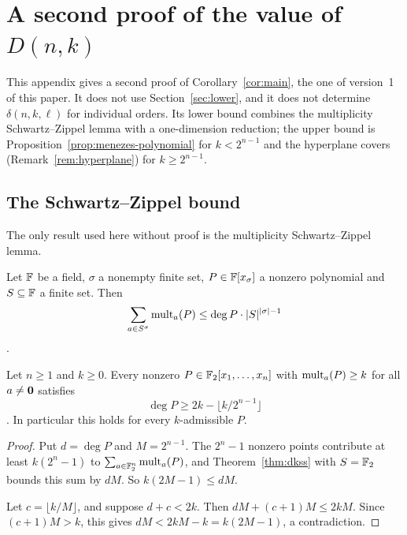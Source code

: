 \section{A second proof of the value of \texorpdfstring{\(D(n,k)\)}{D(n,k)}}\label{sec:second-proof}

This appendix gives a second proof of Corollary~\ref{cor:main}, the one of
version~1 of this paper. It does not use Section~\ref{sec:lower}, and it does not
determine \(\delta(n,k,\ell)\) for individual orders. Its lower bound combines
the multiplicity Schwartz--Zippel lemma with a one-dimension reduction; the
upper bound is Proposition~\ref{prop:menezes-polynomial} for \(k<2^{n-1}\) and
the hyperplane covers (Remark~\ref{rem:hyperplane}) for \(k\ge2^{n-1}\).

\subsection{The Schwartz--Zippel bound}

The only result used here without proof is the multiplicity Schwartz--Zippel
lemma.

\begin{theorem}\label{thm:dkss}
Let \(\mathbb F\) be a field, \(\sigma\) a nonempty finite set, \(P\in\mathbb F[x_\sigma]\) a
nonzero polynomial and \(S\subseteq\mathbb F\) a finite set. Then
\[
 \sum_{a\in S^\sigma}\operatorname{mult}_a(P)\le\deg P\cdot|S|^{|\sigma|-1}
\]
.
\end{theorem}

\begin{proposition}\label{prop:cover-bound}
Let \(n\ge1\) and \(k\ge0\). Every nonzero \(P\in\mathbb F_2[x_1,\ldots,x_n]\) with
\(\operatorname{mult}_a(P)\ge k\) for all \(a\ne\mathbf 0\) satisfies
\[
 \deg P\ge2k-\lfloor k/2^{n-1}\rfloor
\]
.
In particular this holds for every \(k\)-admissible \(P\).
\end{proposition}

\begin{proof}
Put \(d=\deg P\) and \(M=2^{n-1}\). The \(2^n-1\) nonzero points contribute at least
\(k(2^n-1)\) to \(\sum_{a\in\mathbb F_2^n}\operatorname{mult}_a(P)\), and Theorem~\ref{thm:dkss} with
\(S=\mathbb F_2\) bounds this sum by \(dM\). So \(k(2M-1)\le dM\).

Let \(c=\lfloor k/M\rfloor\), and suppose \(d+c<2k\). Then
\(dM+(c+1)M\le2kM\). Since \((c+1)M>k\), this gives \(dM<2kM-k=k(2M-1)\), a
contradiction.
\end{proof}

